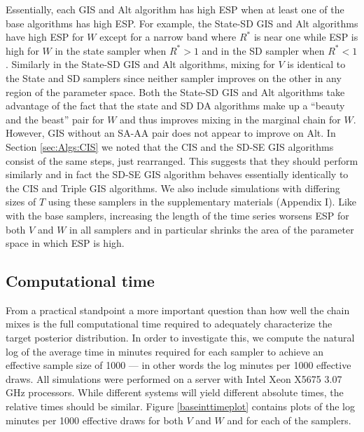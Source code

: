 \documentclass[12pt]{article}
\begin{document}
Essentially, each GIS and Alt algorithm has high ESP when at least one of the base algorithms has high ESP. For example, the State-SD GIS and Alt algorithms have high ESP for $W$ except for a narrow band where $R^*$ is near one while ESP is high for $W$ in the state sampler when $R^*>1$ and in the SD sampler when $R^*<1$. Similarly in the State-SD GIS and Alt algorithms, mixing for $V$ is identical to the State and SD samplers since neither sampler improves on the other in any region of the parameter space. Both the State-SD GIS and Alt algorithms take advantage of the fact that the state and SD DA algorithms make up a ``beauty and the beast'' pair for $W$ and thus improves mixing in the marginal chain for $W$. However, GIS without an SA-AA pair does not appear to improve on Alt. In Section \ref{sec:Algs:CIS} we noted that the CIS and the SD-SE GIS algorithms consist of the same steps, just rearranged. This suggests that they should perform similarly and in fact the SD-SE GIS algorithm behaves essentially identically to the CIS and Triple GIS algorithms. We also include simulations with differing sizes of $T$ using these samplers in the supplementary materials (Appendix I). Like with the base samplers, increasing the length of the time series worsens ESP for both $V$ and $W$ in all samplers and in particular shrinks the area of the parameter space in which ESP is high.

\subsection{Computational time}\label{sec:LLM:time}

From a practical standpoint a more important question than how well the chain mixes is the full computational time required to adequately characterize the target posterior distribution. In order to investigate this, we compute the natural log of the average time in minutes required for each sampler to achieve an effective sample size of 1000 --- in other words the log minutes per 1000 effective draws. All simulations were performed on a server with Intel Xeon X5675 3.07 GHz processors. While different systems will yield different absolute times, the relative times should be similar. Figure \ref{baseinttimeplot} contains plots of the log minutes per 1000 effective draws for both $V$ and $W$ and for each of the samplers.
\end{document}
